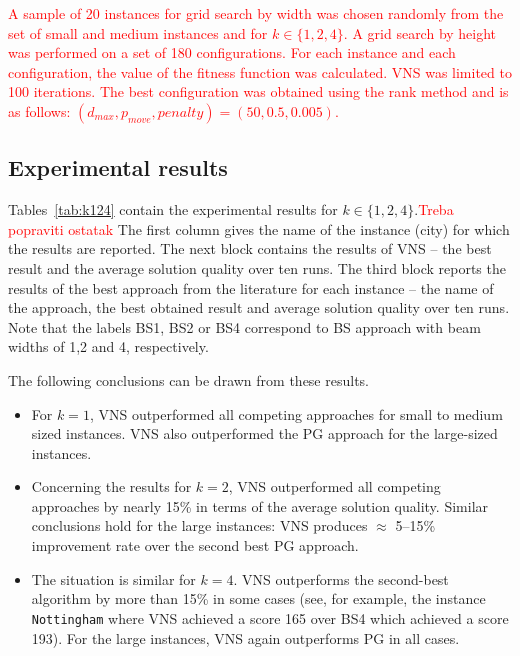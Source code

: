 \documentclass[dvipsnames,format=sigconf]{acmart} %
\begin{document}
	\textcolor{red}{A sample of 20 instances for grid search by width was chosen randomly from the set of small and medium instances and for  $k\in \{1, 2, 4\}$. A grid search by height was performed on a set of 180 configurations. For each instance and each configuration, the value of the fitness function was calculated. VNS was limited to 100 iterations. The best configuration   was obtained using the rank method and is as follows: $(d_{max}, p_{move}, penalty )=(50,0.5, 0.005)$.}

\subsection{Experimental results }
 Tables~\ref{tab:k124} contain the experimental results for $k \in \{1, 2,4\}$.\textcolor{red}{Treba popraviti ostatak} The first column gives the name of the instance (city) for which the results are reported. The next block contains the results of VNS -- the best result and the average solution quality over ten runs. The third block reports the results of the best approach from the literature for each instance -- the name of the approach, the best obtained result and average solution quality over ten runs. Note that the labels BS1, BS2 or BS4 correspond to BS approach with beam widths of 1,2 and 4, respectively. 
 
The following conclusions can be drawn from these results. 
   
\begin{itemize}
  		\item  For $k=1$, VNS outperformed all competing approaches for small to medium sized instances. VNS also outperformed the PG approach for the large-sized instances.  
  		\item Concerning the results for $k=2$, VNS outperformed all competing approaches by nearly 15\% in terms of the average solution quality. Similar conclusions hold for the large instances: VNS produces $\approx$ 5--15\% improvement rate over the second best PG approach. 
  		\item The situation is similar for $k=4$. VNS outperforms the second-best algorithm by more than 15\% in some cases (see, for example,  the instance \texttt{Nottingham} where VNS achieved a score 165 over BS4 which achieved a score 193). For the large instances, VNS again outperforms PG in all cases. 
  		
\end{itemize}
\end{document}

